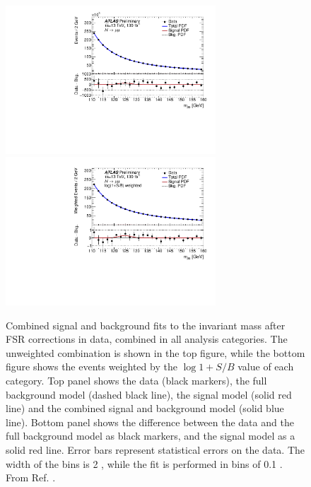 \begin{figure}[h!]
  \centering
  \includegraphics[width=0.7\textwidth]{figures/hmumu/fits/inclusive}
  \includegraphics[width=0.7\textwidth]{figures/hmumu/fits/inclusive_w}
  \caption[Combined signal and background fit to data]{
  Combined signal and background fits to the invariant mass after FSR
  corrections in data, combined in all analysis categories.
  The unweighted combination is shown in the top figure, while the
  bottom figure shows the events weighted by the $\log{1 + S/B}$
  value of each category. Top panel shows the data (black
  markers), the full background model (dashed black line), the signal
  model (solid red line) and the combined signal and background model
  (solid blue line). Bottom panel shows the difference between the data
  and the full background model as black markers, and the signal model
  as a solid red line. Error bars represent statistical errors on
  the data. The width of the bins is 2 \GeV, while the fit is
  performed in bins of 0.1 \GeV.
  From Ref. \cite{ATLAS-CONF-2019-028}.
  }
  \label{fig:hmumu:fit-combination}
\end{figure}


